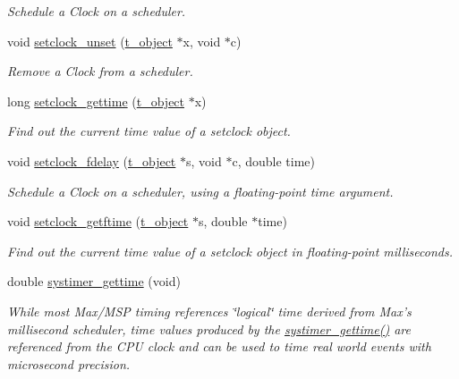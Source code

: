 \begin{DoxyCompactItemize}
\begin{DoxyCompactList}\small\item\em Schedule a Clock on a scheduler. \item\end{DoxyCompactList}\item 
void \hyperlink{group__clocks_gafbc6d9baa43a561b1840b8b4ce6bed5c}{setclock\_\-unset} (\hyperlink{structt__object}{t\_\-object} $\ast$x, void $\ast$c)
\begin{DoxyCompactList}\small\item\em Remove a Clock from a scheduler. \item\end{DoxyCompactList}\item 
long \hyperlink{group__clocks_ga1322ff3659b3d754298c636ad1856903}{setclock\_\-gettime} (\hyperlink{structt__object}{t\_\-object} $\ast$x)
\begin{DoxyCompactList}\small\item\em Find out the current time value of a setclock object. \item\end{DoxyCompactList}\item 
void \hyperlink{group__clocks_ga91badd52e8729b007c22461368a21854}{setclock\_\-fdelay} (\hyperlink{structt__object}{t\_\-object} $\ast$s, void $\ast$c, double time)
\begin{DoxyCompactList}\small\item\em Schedule a Clock on a scheduler, using a floating-\/point time argument. \item\end{DoxyCompactList}\item 
void \hyperlink{group__clocks_gafd1993dc69a6232cf28683961c97b9e4}{setclock\_\-getftime} (\hyperlink{structt__object}{t\_\-object} $\ast$s, double $\ast$time)
\begin{DoxyCompactList}\small\item\em Find out the current time value of a setclock object in floating-\/point milliseconds. \item\end{DoxyCompactList}\item 
double \hyperlink{group__clocks_ga11fd7e2733b0186ff82e9766db3031e7}{systimer\_\-gettime} (void)
\begin{DoxyCompactList}\small\item\em While most Max/MSP timing references \char`\"{}logical\char`\"{} time derived from Max's millisecond scheduler, time values produced by the \hyperlink{group__clocks_ga11fd7e2733b0186ff82e9766db3031e7}{systimer\_\-gettime()} are referenced from the CPU clock and can be used to time real world events with microsecond precision. \item\end{DoxyCompactList}\item 

\end{DoxyCompactItemize}
